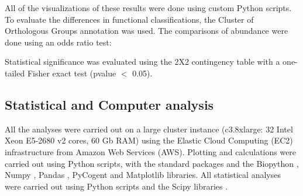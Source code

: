 All of the visualizations of these results were done using custom Python scripts. To evaluate the differences in functional classifications, the Cluster of Orthologous Groups \cite{Tatusov:2003fk} annotation was used. The comparisons of abundance were done using an odds ratio test:

\begin{center}
\end{center}

Statistical significance was evaluated using the 2X2 contingency table with a one-tailed Fisher exact test (pvalue $<$ 0.05).


\subsection{Statistical and Computer analysis}

All the analyses were carried out on a large cluster instance (c3.8xlarge: 32 Intel Xeon E5-2680 v2 cores, 60 Gb RAM) using the Elastic Cloud Computing (EC2) infrastructure from Amazon Web Services (AWS). Plotting and calculations were carried out using Python scripts, with the standard packages and the Biopython \cite{Cock:2009hj}, Numpy \cite{Oliphant:2007ud}, Pandas \cite{mckinney-proc-scipy-2010}, PyCogent \cite{Knight:2007gp} and Matplotlib \cite{Hunter:2007ih} libraries. All statistical analyses were carried out using Python scripts and the Scipy libraries \cite{Oliphant:2007ud}. 



